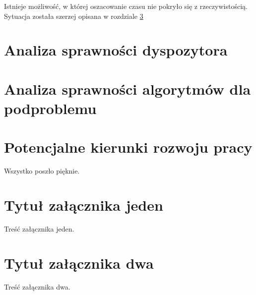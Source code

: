 \documentclass[brudnopis]{xmgr}
\begin{document}
Istnieje możliwość, w której oszacowanie czasu nie pokryło się z rzeczywistością. Sytuacja została szerzej opisana w rozdziale \ref{chap:extend}

\chapter{Analiza sprawności dyspozytora}


\chapter{Analiza sprawności algorytmów dla podproblemu}


\chapter{Potencjalne kierunki rozwoju pracy} \label{chap:extend}


\summary

Wszystko poszło pięknie.

\appendix
\chapter{Tytuł załącznika jeden}

Treść załącznika jeden.

\chapter{Tytuł załącznika dwa}

Treść załącznika dwa.




\listoftables

\listoffigures

\oswiadczenie
\end{document}
